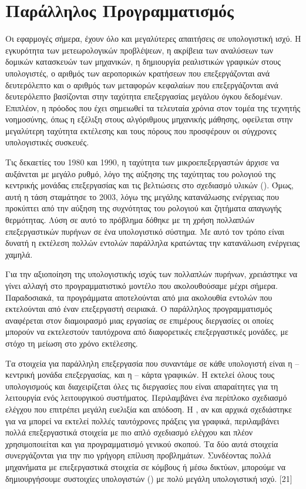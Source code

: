 \chapter{Παράλληλος Προγραμματισμός}

Οι εφαρμογές σήμερα, έχουν όλο και μεγαλύτερες απαιτήσεις σε υπολογιστική ισχύ. Η εγκυρότητα των μετεωρολογικών προβλέψεων, η ακρίβεια των αναλύσεων των δομικών κατασκευών των μηχανικών, η δημιουργία ρεαλιστικών γραφικών στους υπολογιστές, ο αριθμός των αεροπορικών κρατήσεων που επεξεργάζονται ανά δευτερόλεπτο και ο αριθμός των μεταφορών κεφαλαίων που επεξεργάζονται ανά δευτερόλεπτο βασίζονται στην ταχύτητα επεξεργασίας μεγάλου όγκου δεδομένων. Επιπλέον, η πρόοδος που έχει σημειωθεί τα τελευταία χρόνια στον τομέα της τεχνητής νοημοσύνης, όπως η εξέλιξη στους αλγόριθμους μηχανικής μάθησης, οφείλεται στην μεγαλύτερη ταχύτητα εκτέλεσης και τους πόρους που προσφέρουν οι σύγχρονες υπολογιστικές συσκευές.

Τις δεκαετίες του 1980 και 1990, η ταχύτητα των μικροεπεξεργαστών άρχισε να αυξάνεται με μεγάλο ρυθμό, λόγο της αύξησης της ταχύτητας του ρολογιού της κεντρικής μονάδας επεξεργασίας και τις βελτιώσεις στο σχεδιασμό υλικών (). Όμως, αυτή η τάση σταμάτησε το 2003, λόγω της μεγάλης κατανάλωσης ενέργειας που προκύπτει από την αύξηση της συχνότητας του ρολογιού και ζητήματα απαγωγής θερμότητας. Λύση σε αυτό το πρόβλημα δόθηκε με τη χρήση πολλαπλών επεξεργαστικών πυρήνων σε ένα υπολογιστικό σύστημα. Με αυτό τον τρόπο είναι δυνατή η εκτέλεση πολλών εντολών παράλληλα κρατώντας την κατανάλωση ενέργειας χαμηλά.

Για την αξιοποίηση της υπολογιστικής ισχύς των πολλαπλών πυρήνων, χρειάστηκε να γίνει αλλαγή στο προγραμματιστικό μοντέλο που ακολουθούσαμε μέχρι σήμερα. Παραδοσιακά, τα προγράμματα αποτελούνται από μια ακολουθία εντολών που εκτελούνται από έναν επεξεργαστή σειριακά. Ο παράλληλος προγραμματισμός αναφέρεται στον διαμοιρασμό μιας εργασίας σε επιμέρους διεργασίες οι οποίες μπορούν να εκτελεστούν ταυτόχρονα από διαφορετικές επεξεργαστικές μονάδες, με στόχο τη μείωση στο χρόνο εκτέλεσης.

Τα στοιχεία για παράλληλη επεξεργασία που συναντάμε σε κάθε υπολογιστή είναι η  – κεντρική μονάδα επεξεργασίας, και η  – κάρτα γραφικών. Η  εκτελεί όλους τους υπολογισμούς και διαχειρίζεται όλες τις διεργασίες που είναι απαραίτητες για τη λειτουργία ενός λειτουργικού συστήματος. Περιλαμβάνει ένα περίπλοκο σχεδιασμό ελέγχου που επιτρέπει μεγάλη ευελιξία και απόδοση. Η , αν και αρχικά σχεδιάστηκε για να μπορεί να εκτελεί πολλές ταυτόχρονες πράξεις για γραφικά, περιλαμβάνει πολλά επεξεργαστικά στοιχεία με πιο απλό σχεδιασμό ελέγχου και πλέον χρησιμοποιείται και για προγραμματισμό γενικού σκοπού. Τα δύο αυτά στοιχεία συνεργάζονται για την πιο γρήγορη επίλυση προβλημάτων. Συνδέοντας πολλά μηχανήματα με επεξεργαστικά στοιχεία σε κόμβους ή μέσω δικτύων, μπορούμε να δημιουργήσουμε συστοιχίες υπολογιστών () με πολύ μεγάλη υπολογιστική ισχύ. [21]

